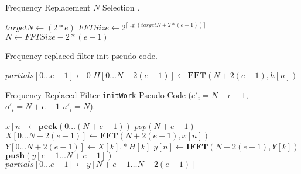 \begin{algorithm}
\caption{Frequency Replacement $N$ Selection .\label{alg:freq-size}}
\begin{algorithmic}
\STATE $targetN \leftarrow (2*e)$
\STATE $FFTSize \leftarrow 2^{\lceil \lg(targetN + 2*(e-1)) \rceil}$
\STATE $N \leftarrow FFTSize - 2*(e-1)$ 
\end{algorithmic}
\end{algorithm}




\begin{algorithm}
  \caption{Frequency replaced filter init pseudo code.\label{alg:freq-init}}
  \begin{algorithmic}
    \STATE $partials[0 \dots e-1] \leftarrow 0$
    \STATE $H[0 \dots N+2(e-1)] \leftarrow \mathbf{FFT}(N+2(e-1),h[n])$
  \end{algorithmic}
\end{algorithm}

\begin{algorithm}
  \caption{Frequency Replaced Filter {\tt initWork} Pseudo Code 
  ($e'_{i}=N+e-1$, $o'_{i}=N+e-1$ $u'_{i}=N$).\label{alg:freq-init-work}}
  \begin{algorithmic}
    \STATE $x[n] \leftarrow \mathbf{peek}(0 \dots (N+e-1))$
    \STATE $pop(N+e-1)$
    \STATE $X[0 \dots N+2(e-1)] \leftarrow \mathbf{FFT} (N+2(e-1), x[n])$
    \STATE $Y[0 \dots N+2(e-1)] \leftarrow X[k] .* H[k]$
    \STATE $y[n] \leftarrow \mathbf{IFFT}(N+2(e-1), Y[k])$
    \STATE $\mathbf{push}(y[e-1 \dots N+e-1])$
    \STATE $partials[0 \dots e-1] \leftarrow y[N+e-1 \dots N+2(e-1)]$
  \end{algorithmic}
\end{algorithm}

